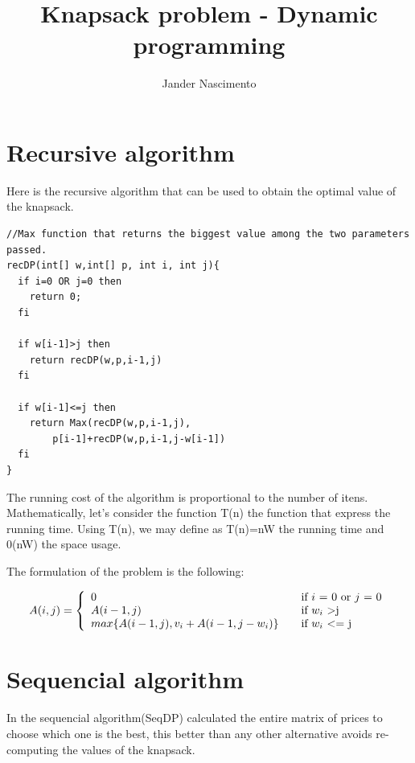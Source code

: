 \documentclass{article}
\begin{document}
\title{Knapsack problem - Dynamic programming}

\author{Jander Nascimento}

\maketitle

\tableofcontents

\section{Recursive algorithm}

Here is the recursive algorithm\cite{algojava} that can be used to obtain the optimal value of the knapsack.

\begin{lstlisting}
//Max function that returns the biggest value among the two parameters passed.
recDP(int[] w,int[] p, int i, int j){
  if i=0 OR j=0 then 
    return 0;
  fi

  if w[i-1]>j then
    return recDP(w,p,i-1,j)
  fi

  if w[i-1]<=j then
    return Max(recDP(w,p,i-1,j),
 		p[i-1]+recDP(w,p,i-1,j-w[i-1])
  fi
}
\end{lstlisting}

The running cost of the algorithm is proportional to the number of itens. Mathematically, let's consider
the function T(n) the function that express the running time. Using T(n), we may define as 
T(n)=nW the running time and 0(nW) the space usage.

The formulation of the problem is the following:

\[
  A(i,j) = \left\{ 
  \begin{array}{l l}
    0 & \quad \textnormal{if $i$ = 0 or $j$ = 0}\\
    A(i-1,j) & \quad \textnormal{if $w_i$ \textgreater j}\\
    max\{A(i-1,j),v_i+A(i-1,j-w_i)\} & \quad \textnormal{if $w_i$ \textless= j}\\
  \end{array} \right.
\]

\section{Sequencial algorithm}          

In the sequencial algorithm(SeqDP) calculated the entire matrix of prices to choose which one is the best, this 
better than any other alternative avoids re-computing the values of the knapsack.
\end{document}

